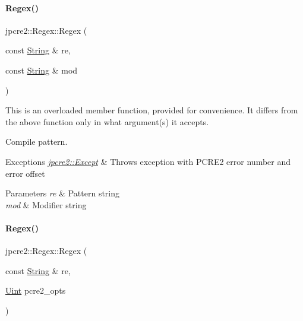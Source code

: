 \paragraph{\texorpdfstring{Regex()}{Regex()}\hspace{0.1cm}{\footnotesize\ttfamily [3/6]}}
{\footnotesize\ttfamily jpcre2\+::\+Regex\+::\+Regex (\begin{DoxyParamCaption}\item[{const \hyperlink{namespacejpcre2_a91f03070152fb228bc116c5a737f1d16}{String} \&}]{re,  }\item[{const \hyperlink{namespacejpcre2_a91f03070152fb228bc116c5a737f1d16}{String} \&}]{mod }\end{DoxyParamCaption})\hspace{0.3cm}{\ttfamily [inline]}}



This is an overloaded member function, provided for convenience. It differs from the above function only in what argument(s) it accepts. 

Compile pattern. 
\begin{DoxyExceptions}{Exceptions}
{\em \hyperlink{classjpcre2_1_1Except}{jpcre2\+::\+Except}} & Throws exception with P\+C\+R\+E2 error number and error offset \\
\hline
\end{DoxyExceptions}

\begin{DoxyParams}{Parameters}
{\em re} & Pattern string \\
\hline
{\em mod} & Modifier string \\
\hline
\end{DoxyParams}
\hypertarget{classjpcre2_1_1Regex_a8f8a1eabf09292b782a6f33287e3fee4_a8f8a1eabf09292b782a6f33287e3fee4}{}\label{classjpcre2_1_1Regex_a8f8a1eabf09292b782a6f33287e3fee4_a8f8a1eabf09292b782a6f33287e3fee4} 
\paragraph{\texorpdfstring{Regex()}{Regex()}\hspace{0.1cm}{\footnotesize\ttfamily [4/6]}}
{\footnotesize\ttfamily jpcre2\+::\+Regex\+::\+Regex (\begin{DoxyParamCaption}\item[{const \hyperlink{namespacejpcre2_a91f03070152fb228bc116c5a737f1d16}{String} \&}]{re,  }\item[{\hyperlink{namespacejpcre2_a078242d38221a13fb3543b9edd78c099}{Uint}}]{pcre2\+\_\+opts }\end{DoxyParamCaption})\hspace{0.3cm}{\ttfamily [inline]}}



